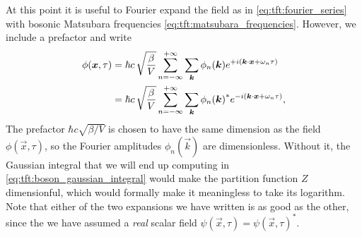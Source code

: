 At this point it is useful to Fourier expand the field as in \eqref{eq:tft:fourier_series} with bosonic Matsubara frequencies \eqref{eq:tft:matsubara_frequencies}.
However, we include a prefactor and write
\begin{equation}
\begin{split}
	\phi({\bm{x}}, \tau) & = \hbar c \, \sqrt{\frac{\beta}{V}} \sum_{n=-\infty}^{+\infty} \sum_{{\bm{k}}}       \phi_n({\bm{k}})  e^{+i ({\bm{k}} \cdot {\bm{x}} + \omega_n \tau)} \\
	                    & = \hbar c \, \sqrt{\frac{\beta}{V}} \sum_{n=-\infty}^{+\infty} \sum_{{\bm{k}}} {\phi_n({\bm{k}})}^* e^{-i ({\bm{k}} \cdot {\bm{x}} + \omega_n \tau)} ,
\end{split}
\label{eq:tft:boson_fourier_series}
\end{equation}
The prefactor $\hbar c \sqrt{\beta/V}$ is chosen to have the same dimension as the field $\phi(\vec{x}, \tau)$, so the Fourier amplitudes $\phi_n(\vec{k})$ are dimensionless.
Without it, the Gaussian integral that we will end up computing in \cref{eq:tft:boson_gaussian_integral} would make the partition function $Z$ dimensionful, which would formally make it meaningless to take its logarithm.
Note that either of the two expansions we have written is as good as the other, since the we have assumed a \emph{real} scalar field $\psi(\vec{x},\tau) = \psi(\vec{x},\tau)^*$.


